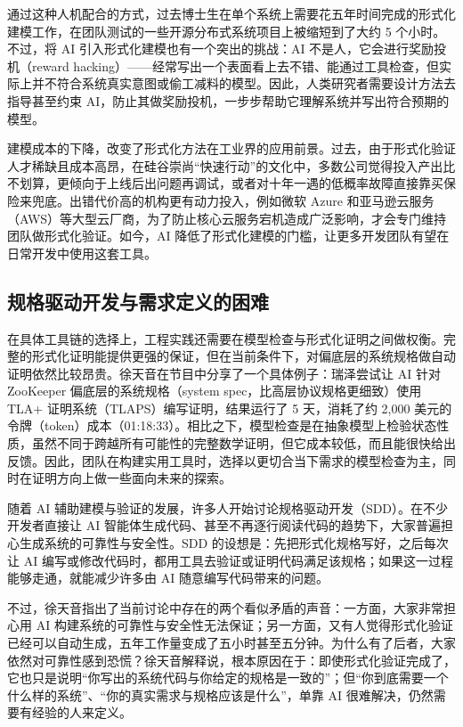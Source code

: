 \documentclass[UTF8,a4paper,11pt,fontset=fandol]{ctexart}
\begin{document}
通过这种人机配合的方式，过去博士生在单个系统上需要花五年时间完成的形式化建模工作，在团队测试的一些开源分布式系统项目上被缩短到了大约 5 个小时。不过，将 AI 引入形式化建模也有一个突出的挑战：AI 不是人，它会进行奖励投机（reward hacking）——经常写出一个表面看上去不错、能通过工具检查，但实际上并不符合系统真实意图或偷工减料的模型。因此，人类研究者需要设计方法去指导甚至约束 AI，防止其做奖励投机，一步步帮助它理解系统并写出符合预期的模型。

建模成本的下降，改变了形式化方法在工业界的应用前景。过去，由于形式化验证人才稀缺且成本高昂，在硅谷崇尚“快速行动”的文化中，多数公司觉得投入产出比不划算，更倾向于上线后出问题再调试，或者对十年一遇的低概率故障直接靠买保险来兜底。出错代价高的机构更有动力投入，例如微软 Azure 和亚马逊云服务（AWS）等大型云厂商，为了防止核心云服务宕机造成广泛影响，才会专门维持团队做形式化验证。如今，AI 降低了形式化建模的门槛，让更多开发团队有望在日常开发中使用这套工具。

\subsection{规格驱动开发与需求定义的困难}
在具体工具链的选择上，工程实践还需要在模型检查与形式化证明之间做权衡。完整的形式化证明能提供更强的保证，但在当前条件下，对偏底层的系统规格做自动证明依然比较昂贵。徐天音在节目中分享了一个具体例子：瑞泽尝试让 AI 针对 ZooKeeper 偏底层的系统规格（system spec，比高层协议规格更细致）使用 TLA+ 证明系统（TLAPS）编写证明，结果运行了 5 天，消耗了约 2,000 美元的令牌（token）成本（01:18:33）。相比之下，模型检查是在抽象模型上检验状态性质，虽然不同于跨越所有可能性的完整数学证明，但它成本较低，而且能很快给出反馈。因此，团队在构建实用工具时，选择以更切合当下需求的模型检查为主，同时在证明方向上做一些面向未来的探索。

随着 AI 辅助建模与验证的发展，许多人开始讨论规格驱动开发（SDD）。在不少开发者直接让 AI 智能体生成代码、甚至不再逐行阅读代码的趋势下，大家普遍担心生成系统的可靠性与安全性。SDD 的设想是：先把形式化规格写好，之后每次让 AI 编写或修改代码时，都用工具去验证或证明代码满足该规格；如果这一过程能够走通，就能减少许多由 AI 随意编写代码带来的问题。

不过，徐天音指出了当前讨论中存在的两个看似矛盾的声音：一方面，大家非常担心用 AI 构建系统的可靠性与安全性无法保证；另一方面，又有人觉得形式化验证已经可以自动生成，五年工作量变成了五小时甚至五分钟。为什么有了后者，大家依然对可靠性感到恐慌？徐天音解释说，根本原因在于：即使形式化验证完成了，它也只是说明“你写出的系统代码与你给定的规格是一致的”；但“你到底需要一个什么样的系统”、“你的真实需求与规格应该是什么”，单靠 AI 很难解决，仍然需要有经验的人来定义。
\end{document}
